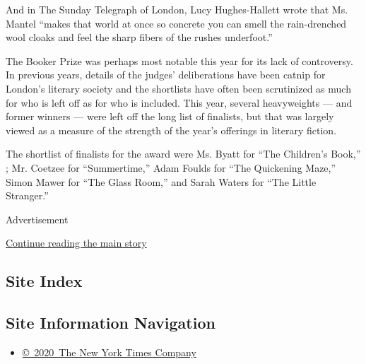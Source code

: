 And in The Sunday Telegraph of London, Lucy Hughes-Hallett wrote that
Ms. Mantel ``makes that world at once so concrete you can smell the
rain-drenched wool cloaks and feel the sharp fibers of the rushes
underfoot.''

The Booker Prize was perhaps most notable this year for its lack of
controversy. In previous years, details of the judges' deliberations
have been catnip for London's literary society and the shortlists have
often been scrutinized as much for who is left off as for who is
included. This year, several heavyweights --- and former winners ---
were left off the long list of finalists, but that was largely viewed as
a measure of the strength of the year's offerings in literary fiction.

The shortlist of finalists for the award were Ms. Byatt for ``The
Children's Book,'' ; Mr. Coetzee for ``Summertime,'' Adam Foulds for
``The Quickening Maze,'' Simon Mawer for ``The Glass Room,'' and Sarah
Waters for ``The Little Stranger.''

Advertisement

\protect\hyperlink{after-bottom}{Continue reading the main story}

\hypertarget{site-index}{%
\subsection{Site Index}\label{site-index}}

\hypertarget{site-information-navigation}{%
\subsection{Site Information
Navigation}\label{site-information-navigation}}

\begin{itemize}
\tightlist
\item
  \href{https://help.nytimes3xbfgragh.onion/hc/en-us/articles/115014792127-Copyright-notice}{©~2020~The
  New York Times Company}
\end{itemize}

